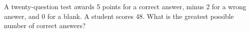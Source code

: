 A twenty-question test awards 5 points for a correct answer, minus 2 for a wrong answer, and 0 for a blank. A student scores 48. What is the greatest possible number of correct answers?
